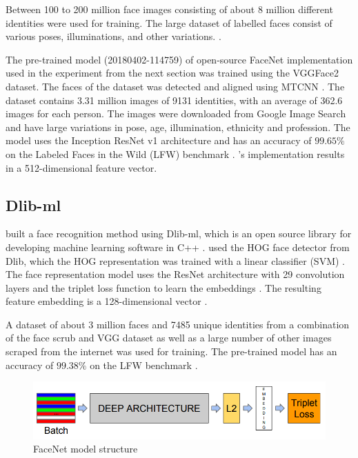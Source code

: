 \documentclass[12pt,english]{article}
\begin{document}
Between 100 to 200 million face images consisting of about 8 million different identities were used for training. The large dataset of labelled faces consist of various poses, illuminations, and other variations. \cite{schroff}.

The pre-trained model (20180402-114759) of open-source FaceNet implementation \cite{sandberg} used in the experiment from the next section was trained using the VGGFace2 dataset. The faces of the dataset was detected and aligned using MTCNN . The dataset contains 3.31 million images of 9131 identities, with an average of 362.6 images for each person. The images were downloaded from Google Image Search and have large variations in pose, age, illumination, ethnicity and profession. The model uses the Inception ResNet v1 architecture and has an accuracy of $99.65\%$ on the Labeled Faces in the Wild (LFW) benchmark \cite{sandberg}. \cite{sandberg}'s implementation results in a 512-dimensional feature vector.

\subsection{Dlib-ml}
\quad
\cite{geitgey} built a face recognition method using Dlib-ml, which is an open source library for developing machine learning software in C++ \cite{king}. \cite{geitgey} used the HOG face detector from Dlib, which the HOG representation was trained with a linear classifier (SVM) \cite{king2014}. The face representation model uses the ResNet architecture with 29 convolution layers and the triplet loss function to learn the embeddings \cite{king2017}. The resulting feature embedding is a 128-dimensional vector \cite{king2017}. 

A dataset of about 3 million faces and 7485 unique identities from a combination of the face scrub and VGG dataset as well as a large number of other images scraped from the internet was used for training. The pre-trained model has an accuracy of $99.38\%$ on the LFW benchmark \cite{king2017}.

\begin{figure}[!tbp]
 \centering
    \includegraphics[width=\textwidth]{figures/facenet_model_archi.png}
    \caption{FaceNet model structure \cite{amos}}
	\label{fig:facemodel}
\end{figure}
\end{document}
